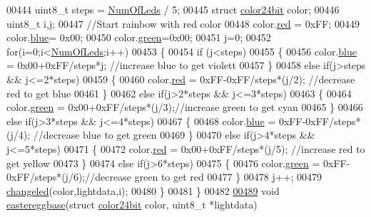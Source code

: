 \begin{DoxyCode}
00444     uint8\_t steps = \hyperlink{globals_8h_ad5db4045aed262ed4aae2af9d81fab98}{NumOfLeds} / 5;
00445     \textcolor{keyword}{struct }\hyperlink{structcolor24bit}{color24bit} color;
00446     uint8\_t i,j;
00447     \textcolor{comment}{//Start rainbow with red color}
00448     color.\hyperlink{structcolor24bit_ad47d918910aaa51c73160ac85999d09c}{red} = 0xFF;
00449     color.\hyperlink{structcolor24bit_a287b397e90d7b995c81ff54e741f96b2}{blue}= 0x00;
00450     color.\hyperlink{structcolor24bit_a90d21fa503b626c00cdc8d94863d5877}{green}=0x00;
00451     j=0;
00452     \textcolor{keywordflow}{for}(i=0;i<\hyperlink{globals_8h_ad5db4045aed262ed4aae2af9d81fab98}{NumOfLeds};i++)
00453     \{
00454         \textcolor{keywordflow}{if} (j<steps)
00455         \{
00456             color.\hyperlink{structcolor24bit_a287b397e90d7b995c81ff54e741f96b2}{blue} = 0x00+0xFF/steps*j;     \textcolor{comment}{//increase blue to get violett      }
00457         \}
00458         \textcolor{keywordflow}{else} \textcolor{keywordflow}{if}(j>steps && j<=2*steps)
00459         \{
00460             color.\hyperlink{structcolor24bit_ad47d918910aaa51c73160ac85999d09c}{red} = 0xFF-0xFF/steps*(j/2);   \textcolor{comment}{//decrease red to get blue}
00461         \}
00462         \textcolor{keywordflow}{else} \textcolor{keywordflow}{if}(j>2*steps && j<=3*steps)
00463         \{
00464             color.\hyperlink{structcolor24bit_a90d21fa503b626c00cdc8d94863d5877}{green} = 0x00+0xFF/steps*(j/3);\textcolor{comment}{//increase green to get cyan}
00465         \}
00466         \textcolor{keywordflow}{else} \textcolor{keywordflow}{if}(j>3*steps && j<=4*steps)
00467         \{
00468             color.\hyperlink{structcolor24bit_a287b397e90d7b995c81ff54e741f96b2}{blue} = 0xFF-0xFF/steps*(j/4); \textcolor{comment}{//decrease blue to get green}
00469         \}
00470         \textcolor{keywordflow}{else} \textcolor{keywordflow}{if}(j>4*steps && j<=5*steps)
00471         \{
00472             color.\hyperlink{structcolor24bit_ad47d918910aaa51c73160ac85999d09c}{red} = 0x00+0xFF/steps*(j/5);   \textcolor{comment}{//increase red to get yellow}
00473         \}
00474         \textcolor{keywordflow}{else} \textcolor{keywordflow}{if}(j>6*steps)
00475         \{
00476             color.\hyperlink{structcolor24bit_a90d21fa503b626c00cdc8d94863d5877}{green} = 0xFF-0xFF/steps*(j/6);\textcolor{comment}{//decrease green to get red}
00477         \}
00478         j++;
00479         \hyperlink{_lightstribe_8c_a63fa595d401f0e85c1bba55ba2b1d66e}{changeled}(color,lightdata,i);
00480     \}
00481 \}
00482 
\hypertarget{_led_effects_8c_source_l00489}{}\hyperlink{_led_effects_8h_ac83bd19da7ebd3c475e3667e4229db41}{00489} \textcolor{keywordtype}{void} \hyperlink{_led_effects_8c_ac83bd19da7ebd3c475e3667e4229db41}{eastereggbase}(\textcolor{keyword}{struct} \hyperlink{structcolor24bit}{color24bit} color, uint8\_t *lightdata)

\end{DoxyCode}
